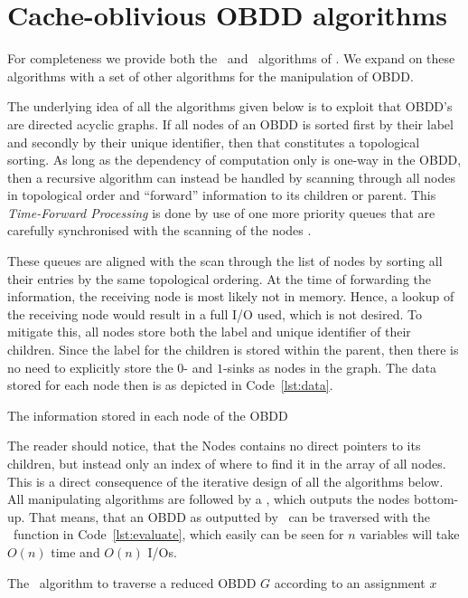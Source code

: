 \newpage
\section{Cache-oblivious OBDD algorithms} \label{sec:theory}

For completeness we provide both the \Reduce\ and \Apply\ algorithms of
\cite{Arge96}. We expand on these algorithms with a set of other algorithms for
the manipulation of OBDD.

The underlying idea of all the algorithms given below is to exploit that OBDD's
are directed acyclic graphs. If all nodes of an OBDD is sorted first by their
label and secondly by their unique identifier, then that constitutes a
topological sorting. As long as the dependency of computation only is one-way in
the OBDD, then a recursive algorithm can instead be handled by scanning through
all nodes in topological order and ``forward'' information to its children or
parent. This \emph{Time-Forward Processing} is done by use of one more priority
queues that are carefully synchronised with the scanning of the nodes \todocite.

These queues are aligned with the scan through the list of nodes by sorting all
their entries by the same topological ordering. At the time of forwarding the
information, the receiving node is most likely not in memory. Hence, a lookup of
the receiving node would result in a full I/O used, which is not desired. To
mitigate this, all nodes store both the label and unique identifier of their
children. Since the label for the children is stored within the parent, then
there is no need to explicitly store the $0$- and $1$-sinks as nodes in the
graph. The data stored for each node then is as depicted in Code~\ref{lst:data}.
\begin{lstfloat}[ht!]
  \centering

  

  \caption{The information stored in each node of the OBDD}
  \label{lst:data}
\end{lstfloat}

The reader should notice, that the Nodes contains no direct pointers to its
children, but instead only an index of where to find it in the array of all
nodes. This is a direct consequence of the iterative design of all the
algorithms below. All manipulating algorithms are followed by a \Reduce, which
outputs the nodes bottom-up. That means, that an OBDD as outputted by \Reduce\
can be traversed with the \Evaluate\ function in Code~\ref{lst:evaluate}, which
easily can be seen for $n$ variables will take $O(n)$ time and $O(n)$ I/Os.
\begin{lstfloat}[ht!]
  \centering

  

  \caption{The \Evaluate\ algorithm to traverse a reduced OBDD $G$ according to an
    assignment $x$}
  \label{lst:evaluate}
\end{lstfloat}

